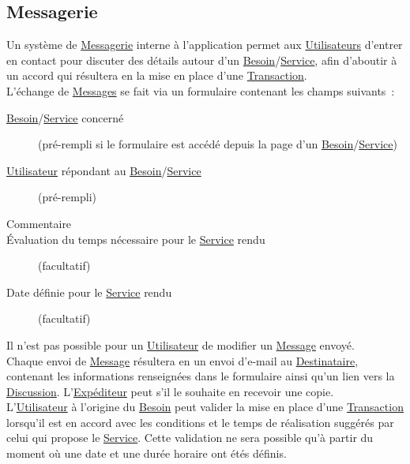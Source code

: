 \documentclass[french,12pt]{article}
\begin{document}
		\subsection{Messagerie}
			
			Un système de \hyperlink{messagerie}{Messagerie} interne à l’application
			 permet aux \hyperlink{utilisateur}{Utilisateurs} d’entrer en contact pour
			 discuter des détails autour d’un
			 \hyperlink{besoin}{Besoin}/\hyperlink{service}{Service}, afin d’aboutir à
			 un accord qui résultera en la mise en place d’une
			 \hyperlink{transaction}{Transaction}.\\
			
			L’échange de \hyperlink{message}{Messages} se fait via un formulaire
			 contenant les champs suivants :
			\begin{description}
				\item [\hyperlink{besoin}{Besoin}/\hyperlink{service}{Service} concerné]
					(pré-rempli si le formulaire est accédé depuis la page d’un
					 \hyperlink{besoin}{Besoin}/\hyperlink{service}{Service})
				\item [\hyperlink{utilisateur}{Utilisateur} répondant au \hyperlink{besoin}{Besoin}/\hyperlink{service}{Service}]
					(pré-rempli)
				\item [Commentaire]
				\item [Évaluation du temps nécessaire pour le \hyperlink{service}{Service} rendu]
					(facultatif)
				\item [Date définie pour le \hyperlink{service}{Service} rendu]
					(facultatif)
			\end{description}
			
			Il n’est pas possible pour un \hyperlink{utilisateur}{Utilisateur} de
			 modifier un \hyperlink{message}{Message} envoyé.\\
			
			Chaque envoi de \hyperlink{message}{Message} résultera en un envoi
			 d’e-mail au \hyperlink{destinataire}{Destinataire}, contenant les
			 informations renseignées dans le formulaire ainsi qu’un lien vers la
			 \hyperlink{discussion}{Discussion}. L’\hyperlink{expediteur}{Expéditeur}
			 peut s’il le souhaite en recevoir une copie.\\
			
			L’\hyperlink{utilisateur}{Utilisateur} à l’origine du
			 \hyperlink{besoin}{Besoin} peut valider la mise en place d’une
			 \hyperlink{transaction}{Transaction} lorsqu’il est en accord avec les
			 conditions et le temps de réalisation suggérés par celui qui propose le
			 \hyperlink{service}{Service}. Cette validation ne sera possible qu’à
			 partir du moment où une date et une durée horaire ont étés définis.\\
			
\end{document}
